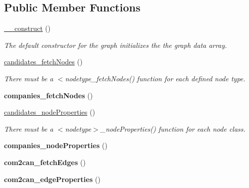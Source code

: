 \subsection*{Public Member Functions}
\begin{DoxyCompactItemize}
\item 
\hyperlink{classFECCanComGraph_a80281c19843e11fe180f54eb33e41258}{\_\-\_\-construct} ()
\begin{DoxyCompactList}\small\item\em The default constructor for the graph initializes the the graph data array. \item\end{DoxyCompactList}\item 
\hyperlink{classFECCanComGraph_a2823c90a2c17e875ed5c1ecaefacb406}{candidates\_\-fetchNodes} ()
\begin{DoxyCompactList}\small\item\em There must be a $<$nodetype\_\-fetchNodes() function for each defined node type. \item\end{DoxyCompactList}\item 
\hypertarget{classFECCanComGraph_ac2ffa9b979d90106cc63cf8662b8676a}{
{\bfseries companies\_\-fetchNodes} ()}
\label{classFECCanComGraph_ac2ffa9b979d90106cc63cf8662b8676a}

\item 
\hyperlink{classFECCanComGraph_ad6e930b0091fa7628329d81822bd7f97}{candidates\_\-nodeProperties} ()
\begin{DoxyCompactList}\small\item\em There must be a $<$nodetype$>$\_\-nodeProperties() function for each node class. \item\end{DoxyCompactList}\item 
\hypertarget{classFECCanComGraph_a12aae1328795455d83b967226544c923}{
{\bfseries companies\_\-nodeProperties} ()}
\label{classFECCanComGraph_a12aae1328795455d83b967226544c923}

\item 
\hypertarget{classFECCanComGraph_a647278b86c542246eb5928519b924513}{
{\bfseries com2can\_\-fetchEdges} ()}
\label{classFECCanComGraph_a647278b86c542246eb5928519b924513}

\item 
\hypertarget{classFECCanComGraph_a44242884b3117deb5266cf13d767b958}{
{\bfseries com2can\_\-edgeProperties} ()}
\label{classFECCanComGraph_a44242884b3117deb5266cf13d767b958}


\end{DoxyCompactItemize}
